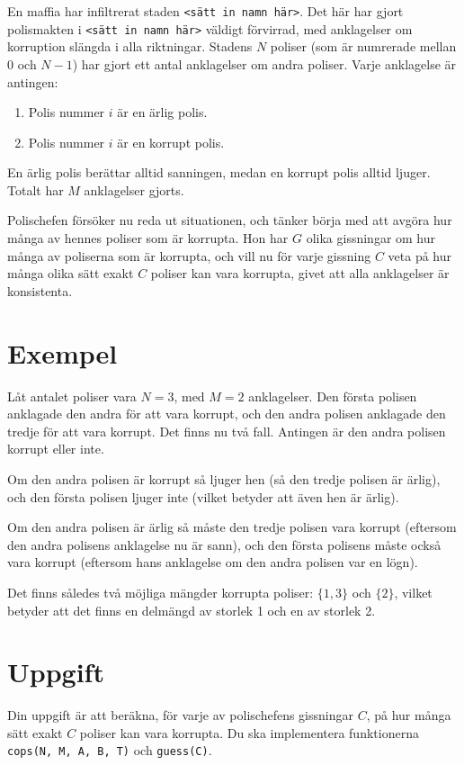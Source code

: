 \newcommand\version{v1}
En maffia har infiltrerat staden \texttt{<sätt in namn här>}.
Det här har gjort polismakten i \texttt{<sätt in namn här>} väldigt förvirrad, med anklagelser om korruption slängda i alla riktningar.
Stadens $N$ poliser (som är numrerade mellan $0$ och $N - 1$) har gjort ett antal anklagelser om andra poliser.
Varje anklagelse är antingen:
\begin{enumerate}
  \item Polis nummer $i$ är en ärlig polis.
  \item Polis nummer $i$ är en korrupt polis.
\end{enumerate}
En ärlig polis berättar alltid sanningen, medan en korrupt polis alltid ljuger.
Totalt har $M$ anklagelser gjorts.

Polischefen försöker nu reda ut situationen, och tänker börja med att avgöra hur många
av hennes poliser som är korrupta. Hon har $G$ olika gissningar om hur många av poliserna som
är korrupta, och vill nu för varje gissning $C$ veta på hur många olika sätt exakt $C$ poliser kan vara korrupta,
givet att alla anklagelser är konsistenta.

\section*{Exempel}
Låt antalet poliser vara $N = 3$, med $M = 2$ anklagelser.
Den första polisen anklagade den andra för att vara korrupt, och den andra polisen anklagade den tredje för att vara korrupt. Det finns nu två fall. Antingen är den andra polisen korrupt eller inte.

Om den andra polisen är korrupt så ljuger hen (så den tredje polisen är ärlig), och den första polisen ljuger inte (vilket betyder att även hen är ärlig).

Om den andra polisen är ärlig så måste den tredje polisen vara korrupt (eftersom den andra polisens anklagelse nu är sann), och den första polisens måste också vara korrupt (eftersom hans anklagelse om den andra polisen var en lögn).

Det finns således två möjliga mängder korrupta poliser: $\{1, 3\}$ och $\{2\}$, vilket betyder att det finns en delmängd av storlek 1 och en av storlek 2.

\section*{Uppgift}
Din uppgift är att beräkna, för varje av polischefens gissningar $C$, på hur många sätt exakt $C$ poliser kan vara korrupta.
Du ska implementera funktionerna \texttt{cops(N, M, A, B, T)} och \texttt{guess(C)}.

